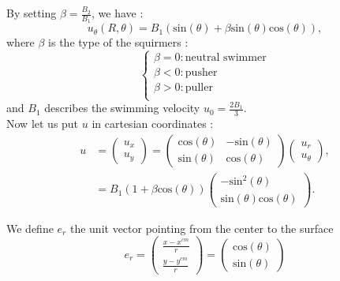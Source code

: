\documentclass{article}
\begin{document}
By setting $\beta=\frac{B_2}{B_1}$, we have :
$$
u_\theta(R,\theta) = B_1(\mathrm{sin}(\theta) + \beta \mathrm{sin}(\theta)\mathrm{cos}(\theta)),
$$
where $\beta$ is the type of the squirmers :
$$\left\{
    \begin{array}{ll}
        \beta = 0 : \text{neutral swimmer}  \\
        \beta < 0 : \mathrm{pusher} \\
        \beta > 0 : \mathrm{puller} \\
    \end{array}
\right.$$
and $B_1$ describes the swimming velocity $u_0 = \frac{2 B_1}{3}$.
\\ Now let us put $u$ in cartesian coordinates :
\begin{align*}
    u &= \begin{pmatrix}
   u_x \\
   u_y
\end{pmatrix}
= \begin{pmatrix}
   \mathrm{cos}(\theta) & -\mathrm{sin}(\theta) \\
   \mathrm{sin}(\theta) & \mathrm{cos}(\theta)
\end{pmatrix}
\begin{pmatrix}
   u_r \\
   u_\theta
\end{pmatrix}, \\
&= B_1 (1 + \beta \mathrm{cos}(\theta))
\begin{pmatrix}
   -\mathrm{sin}^2(\theta) \\
   \mathrm{sin}(\theta)\mathrm{cos}(\theta)
\end{pmatrix}.
\end{align*}

We define $e_r$ the unit vector pointing from the center to the surface 
$$
e_r = \begin{pmatrix}
   \frac{x - x^{cm}}{r}  \\
   \frac{y - y^{cm}}{r} 
\end{pmatrix} = \begin{pmatrix}
   \mathrm{cos}(\theta) \\
   \mathrm{sin}(\theta)
\end{pmatrix}$$ 
\end{document}
